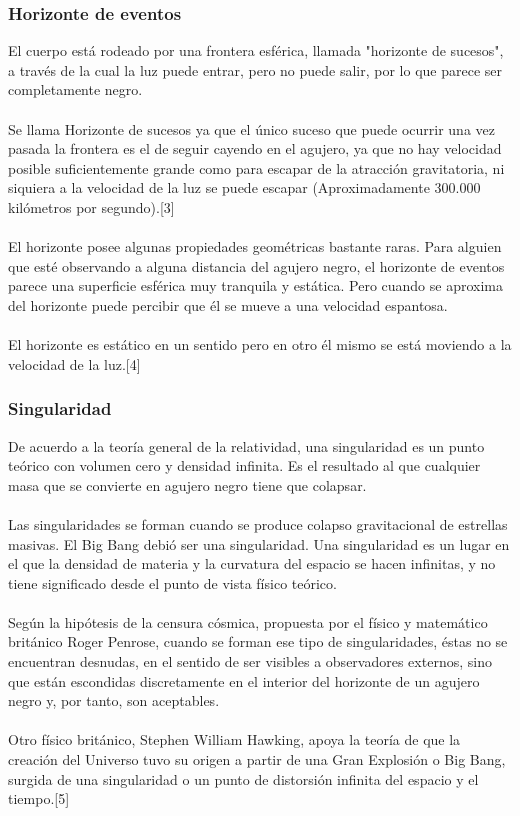 \documentclass[12pt]{article}
\begin{document}
\subsubsection{Horizonte de eventos}
El cuerpo está rodeado por una frontera esférica, llamada "horizonte de sucesos", a través de la cual la luz puede entrar, pero no puede salir, por lo que parece ser completamente negro.\\\\
Se llama Horizonte de sucesos ya que el único suceso que puede ocurrir una vez pasada la frontera es el de seguir cayendo en el agujero, ya que no hay velocidad posible suficientemente grande como para escapar de la atracción gravitatoria, ni siquiera a la velocidad de la luz se puede escapar (Aproximadamente 300.000 kilómetros por segundo).[3]\\\\%
El horizonte posee algunas propiedades geométricas bastante raras. Para alguien que esté observando a alguna distancia del agujero negro, el horizonte de eventos parece una superficie esférica muy tranquila y estática. Pero cuando se aproxima del horizonte puede percibir que él se mueve a una velocidad espantosa.
\\\\
El horizonte es estático en un sentido pero en otro él mismo se está moviendo a la velocidad de la luz.[4]
\\%
\subsubsection{Singularidad}
De acuerdo a la teoría general de la relatividad, una singularidad es un punto teórico con volumen cero y densidad infinita. Es el resultado al que cualquier masa que se convierte en agujero negro tiene que colapsar.
\\\\
Las singularidades se forman cuando se produce colapso gravitacional de estrellas masivas. El Big Bang debió ser una singularidad. Una singularidad es un lugar en el que la densidad de materia y la curvatura del espacio se hacen infinitas, y no tiene significado desde el punto de vista físico teórico.
\\\\
Según la hipótesis de la censura cósmica, propuesta por el físico y matemático británico Roger Penrose, cuando se forman ese tipo de singularidades, éstas no se encuentran desnudas, en el sentido de ser visibles a observadores externos, sino que están escondidas discretamente en el interior del horizonte de un agujero negro y, por tanto, son aceptables.
\\\\
Otro físico británico, Stephen William Hawking, apoya la teoría de que la creación del Universo tuvo su origen a partir de una Gran Explosión o Big Bang, surgida de una singularidad o un punto de distorsión infinita del espacio y el tiempo.[5]
\\\\%
\end{document}
